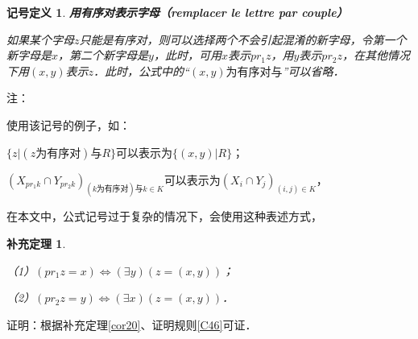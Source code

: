 \documentclass[12pt, a4paper, oneside]{book}
\newtheorem{sign}{记号定义}
\newtheorem{cor}{补充定理}
\begin{document}
			\begin{sign}
				\textbf{用有序对表示字母（remplacer le lettre par couple）}
				\par
				如果某个字母$z$只能是有序对，则可以选择两个不会引起混淆的新字母，令第一个新字母是$x$，第二个新字母是$y$，此时，可用$x$表示$pr_1z$，用$y$表示$pr_2z$，在其他情况下用$(x, y)$表示$z$．此时，公式中的“$(x, y)\text{为有序对}\text{与}$”可以省略．
			\end{sign}
			注：
			\par
			使用该记号的例子，如：
			\par
			$\{z|(z\text{为有序对})\text{与}R\}$可以表示为$\{(x, y)|R\}$；
			\par
			$(X_{pr_1k}\cap Y_{pr_2k})_{(k\text{为有序对})\text{与}k \in K}$可以表示为$(X_i\cap Y_j)_{(i, j)\in K}$，
			\par
			在本文中，公式记号过于复杂的情况下，会使用这种表述方式，
			
			\begin{cor}\label{cor21}
				\hfill\par
				（1）$(pr_1z=x)\Leftrightarrow (\exists y)(z=(x, y))$；
				\par
				（2）$(pr_2z=y)\Leftrightarrow (\exists x)(z=(x, y))$．				
			\end{cor}
			证明：根据补充定理\ref{cor20}、证明规则\ref{C46}可证．
\end{document}
